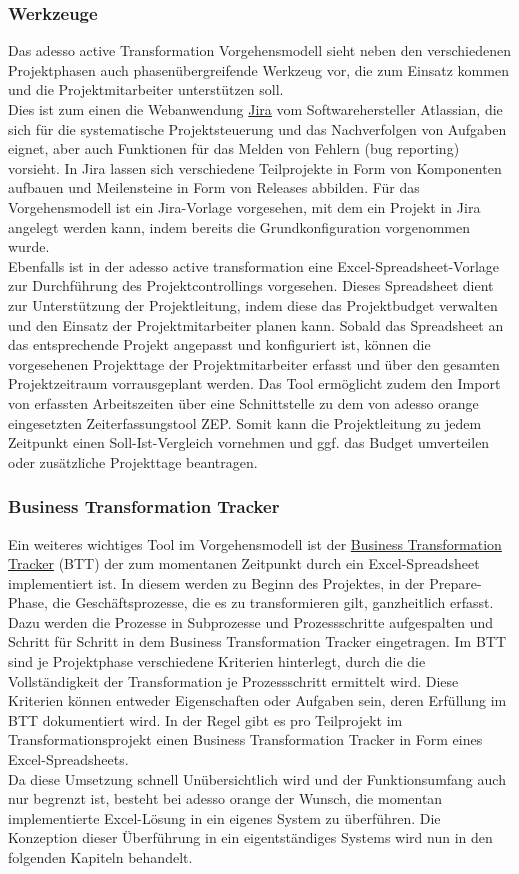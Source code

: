 \subsubsection{Werkzeuge}
Das adesso active Transformation Vorgehensmodell sieht neben den verschiedenen Projektphasen auch phasenübergreifende Werkzeug vor, die zum Einsatz kommen und die Projektmitarbeiter unterstützen soll. \\Dies ist zum einen die Webanwendung \underline{\glqq{}Jira\grqq{}} vom Softwarehersteller Atlassian, die sich für die systematische Projektsteuerung und das Nachverfolgen von Aufgaben eignet, aber auch Funktionen für das Melden von Fehlern (bug reporting) vorsieht. In Jira lassen sich verschiedene Teilprojekte in Form von Komponenten aufbauen und Meilensteine in Form von Releases abbilden. Für das Vorgehensmodell ist ein Jira-Vorlage vorgesehen, mit dem ein Projekt in Jira angelegt werden kann, indem bereits die Grundkonfiguration vorgenommen wurde.\\
Ebenfalls ist in der adesso active transformation eine Excel-Spreadsheet-Vorlage zur Durchführung des Projektcontrollings vorgesehen. Dieses Spreadsheet dient zur Unterstützung der Projektleitung, indem diese das Projektbudget verwalten und den Einsatz der Projektmitarbeiter planen kann. Sobald das Spreadsheet an das entsprechende Projekt angepasst und konfiguriert ist, können die vorgesehenen Projekttage der Projektmitarbeiter erfasst und über den gesamten Projektzeitraum vorrausgeplant werden.  
Das Tool ermöglicht zudem den Import von erfassten Arbeitszeiten über eine Schnittstelle zu dem von adesso orange eingesetzten Zeiterfassungstool \glqq{}ZEP\grqq{}. Somit kann die Projektleitung zu jedem Zeitpunkt einen Soll-Ist-Vergleich vornehmen und ggf. das Budget umverteilen oder zusätzliche Projekttage beantragen.

\subsubsection{Business Transformation Tracker}
Ein weiteres wichtiges Tool im Vorgehensmodell ist der \underline{\glqq{}Business Transformation Tracker\grqq{}} (BTT) der zum momentanen Zeitpunkt durch ein Excel-Spreadsheet implementiert ist. In diesem werden zu Beginn des Projektes, in der Prepare-Phase, die Geschäftsprozesse, die es zu transformieren gilt, ganzheitlich erfasst. Dazu werden die Prozesse in Subprozesse und Prozessschritte aufgespalten und Schritt für Schritt in dem Business Transformation Tracker eingetragen. Im BTT sind je Projektphase verschiedene Kriterien hinterlegt, durch die die Vollständigkeit der Transformation je Prozessschritt ermittelt wird. Diese Kriterien können entweder Eigenschaften oder Aufgaben sein, deren Erfüllung im BTT dokumentiert wird. In der Regel gibt es pro Teilprojekt im Transformationsprojekt einen Business Transformation Tracker in Form eines Excel-Spreadsheets.\\
Da diese Umsetzung schnell Unübersichtlich wird und der Funktionsumfang auch nur begrenzt ist, besteht bei adesso orange der Wunsch, die momentan implementierte Excel-Lösung in ein eigenes System zu überführen. Die Konzeption dieser Überführung in ein eigentständiges Systems wird nun in den folgenden Kapiteln behandelt.